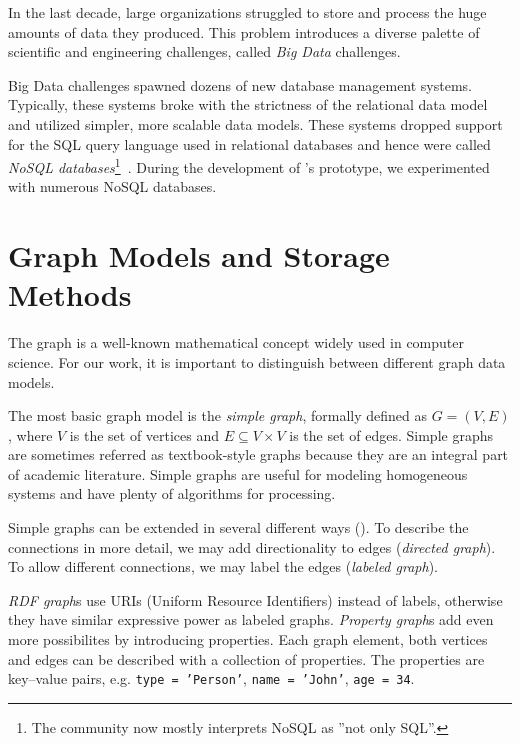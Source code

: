 In the last decade, large organizations struggled to store and process the huge amounts of data they produced. This problem introduces a diverse palette of scientific and engineering challenges, called \emph{Big Data} challenges. 

Big Data challenges spawned dozens of new database management systems. Typically, these systems broke with the strictness of the relational data model and utilized simpler, more scalable data models. These systems dropped support for the SQL query language used in relational databases and hence were called \emph{NoSQL databases}\footnote{The community now mostly interprets NoSQL as ''not only SQL''.}~\cite{NoSQL}. During the development of \iqd{}'s prototype, we experimented with numerous NoSQL databases.

\section{Graph Models and Storage Methods}

The graph is a well-known mathematical concept widely used in computer science. For our work, it is important to distinguish between different graph data models.


The most basic graph model is the \emph{simple graph}, formally defined as $G = (V, E)$, where $V$ is the set of vertices and $E \subseteq V \times V$ is the set of edges. Simple graphs are sometimes referred as textbook-style graphs because they are an integral part of academic literature. Simple graphs are useful for modeling homogeneous systems and have plenty of algorithms for processing.

Simple graphs can be extended in several different ways (). To describe the connections in more detail, we may add directionality to edges (\emph{directed graph}). To allow different connections, we may label the edges (\emph{labeled graph}). 

\emph{RDF graph}s use URIs (Uniform Resource Identifiers) instead of labels, otherwise they have similar expressive power as labeled graphs. \emph{Property graph}s add even more possibilites by introducing properties. Each graph element, both vertices and edges can be described with a collection of properties. The properties are key--value pairs, e.g. \texttt{type = 'Person'}, \texttt{name = 'John'}, \texttt{age = 34}.

